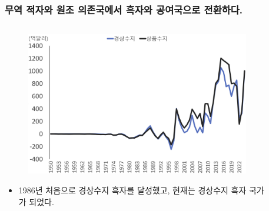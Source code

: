 \documentclass[aspectratio=169,xcolor=dvipsnames,handout]{beamer}
\begin{document}
\begin{frame}
\frametitle{무역 적자와 원조 의존국에서 흑자와 공여국으로 전환하다.}
\begin{columns}
    \begin{column}{.5\textwidth}
        \begin{figure}
            \centering
            \includegraphics[width=.8\textwidth]{pic/fig_econ_06.png}
        \end{figure}
        \begin{itemize}[<+->]
            \item 1986년 처음으로 경상수지 흑자를 달성했고, 현재는 경상수지 흑자 국가가 되었다.
        \end{itemize}
    \end{column}
    \begin{column}{.5\textwidth}
        \begin{figure}
            \centering

\end{figure}
\end{column}
\end{columns}
\end{frame}
\end{document}

